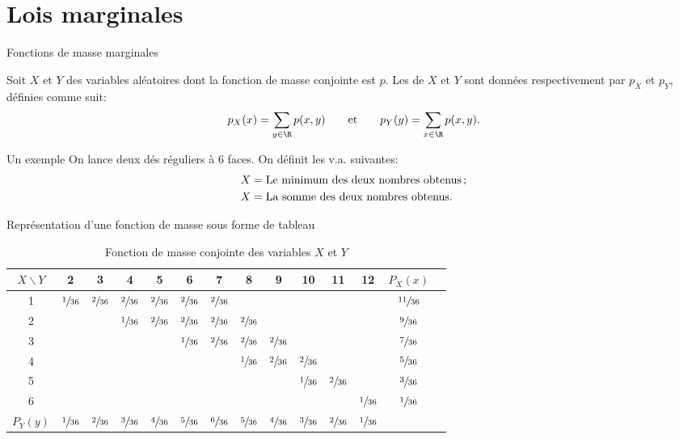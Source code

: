 \documentclass[nuit,charter,pied]{BeamerJS}
\begin{document}
\section[Lois marg.]{Lois marginales}
\begin{frame}[t]{Fonctions de masse marginales}
	\pause
	\begin{defn}{}
		Soit $X$ et $Y$ des variables aléatoires dont la fonction de masse conjointe est $p$. Les  de $X$ et $Y$ sont données respectivement par $p_X$ et $p_Y$, définies comme suit:
		\[p_X(x)=\sum_{y\in\R}p(x,y)\qquad\text{et}\qquad p_Y(y)=\sum_{x\in\R}p(x,y).\]
	\end{defn}
\end{frame}
\begin{frame}[t]{Un exemple}
	On lance deux dés réguliers à 6 faces. On définit les v.a. suivantes:
	\begin{align*}
	X&=\text{Le minimum des deux nombres obtenus\,;}\\
	X&=\text{La somme des deux nombres obtenus.}
	\end{align*}
\end{frame}
\begin{frame}[t]{Représentation d'une fonction de masse sous forme de tableau}
	\begin{table}[h!]
\centering\footnotesize\setlength{\tabcolsep}{4pt}
\begin{tabular}{c c c c c c c c c c c c c c}
\toprule
$X \backslash Y$ & 2 & 3 & 4 & 5 & 6 & 7 & 8 & 9 & 10 & 11 & 12 & $P_X(x)$ \\
\midrule
1 & $\sfrac{1}{36}$ & $\sfrac{2}{36}$ & $\sfrac{2}{36}$ & $\sfrac{2}{36}$ & $\sfrac{2}{36}$ & $\sfrac{2}{36}$ & &  &  &  &  & $\sfrac{11}{36}$ \\
2 & &  & $\sfrac{1}{36}$ & $\sfrac{2}{36}$ & $\sfrac{2}{36}$ & $\sfrac{2}{36}$ & $\sfrac{2}{36}$ & & & & & $\sfrac{9}{36}$ \\
3 & & & &  & $\sfrac{1}{36}$ & $\sfrac{2}{36}$ & $\sfrac{2}{36}$ &$\sfrac{2}{36}$ & & & & $\sfrac{7}{36}$ \\
4 & & & &  &  &  & $\sfrac{1}{36}$ & $\sfrac{2}{36}$ & $\sfrac{2}{36}$ & & & $\sfrac{5}{36}$ \\
5 & & & & &  &  & & & $\sfrac{1}{36}$ & $\sfrac{2}{36}$ & & $\sfrac{3}{36}$ \\
6 & & & & & &  & & & & &$\sfrac{1}{36}$ & $\sfrac{1}{36}$ \\
\midrule
$P_Y(y)$ & $\sfrac{1}{36}$ & $\sfrac{2}{36}$ & $\sfrac{3}{36}$ & $\sfrac{4}{36}$ & $\sfrac{5}{36}$ & $\sfrac{6}{36}$ & $\sfrac{5}{36}$ & $\sfrac{4}{36}$ & $\sfrac{3}{36}$ & $\sfrac{2}{36}$ & $\sfrac{1}{36}$ & \\
\bottomrule
\end{tabular}
\caption{Fonction de masse conjointe des variables $X$ et $Y$}
\end{table}
\end{frame}
\end{document}
